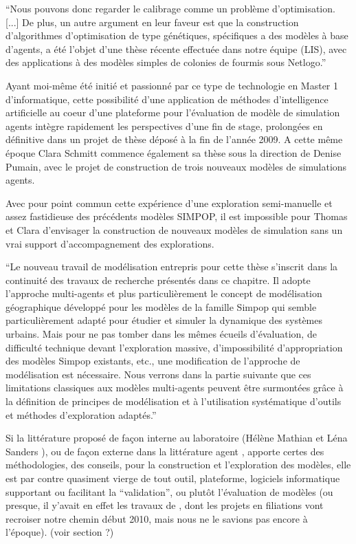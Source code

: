 \enquote{Nous pouvons donc regarder le calibrage comme un problème d’optimisation. [...] De plus, un autre argument en leur faveur est que la construction d’algorithmes d’optimisation de type génétiques, spécifiques a des modèles à base d’agents, a été l’objet d’une thèse récente effectuée dans notre équipe (LIS), avec des applications à des modèles simples de colonies de fourmis sous Netlogo.}

Ayant moi-même été initié et passionné par ce type de technologie en Master 1 d'informatique, cette possibilité d'une application de méthodes d'intelligence artificielle au coeur d'une plateforme pour l'évaluation de modèle de simulation agents intègre rapidement les perspectives d'une fin de stage, prolongées en définitive dans un projet de thèse déposé à la fin de l'année 2009. A cette même époque Clara Schmitt commence également sa thèse sous la direction de Denise Pumain, avec le projet de construction de trois nouveaux modèles de simulations agents.

Avec pour point commun cette expérience d'une exploration semi-manuelle et assez fastidieuse des précédents modèles SIMPOP, il est impossible pour Thomas et Clara d'envisager la construction de nouveaux modèles de simulation sans un vrai support d'accompagnement des explorations.

\enquote{Le nouveau travail de modélisation entrepris pour cette thèse s’inscrit dans la continuité des travaux de recherche présentés dans ce chapitre. Il adopte l’approche multi-agents et plus particulièrement le concept de modélisation géographique développé pour les modèles de la famille Simpop qui semble particulièrement adapté pour étudier et simuler la dynamique des systèmes urbains. Mais pour ne pas tomber dans les mêmes écueils d’évaluation, de difficulté technique devant l’exploration massive, d’impossibilité d’appropriation des modèles Simpop existants, etc., une modification de l’approche de modélisation est nécessaire. Nous verrons dans la partie suivante que ces limitations classiques aux modèles multi-agents peuvent être surmontées grâce à la définition de principes de modélisation et à l’utilisation systématique d’outils et méthodes d’exploration adaptés.} \autocite[113]{Schmitt2014}

Si la littérature proposé de façon interne au laboratoire (Hélène Mathian et Léna Sanders \autocite{Mathian2014}), ou de façon externe dans la littérature agent \autocites{Amblard2006, Sargent2010, Gilbert2008}, apporte certes des méthodologies, des conseils, pour la construction et l'exploration des modèles, elle est par contre quasiment vierge de tout outil, plateforme, logiciels informatique supportant ou facilitant la \enquote{validation}, ou plutôt l'évaluation de modèles \autocite{Amblard2006} (ou presque, il y'avait en effet les travaux de \textcite{Amblard2003}, dont les projets en filiations vont recroiser notre chemin début 2010, mais nous ne le savions pas encore à l'époque). (voir section ?)

